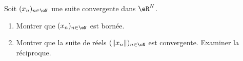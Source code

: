 \begin{exercice}[\minsyndical]\label{exoEspVectoNorme0004}

Soit $(x_n)_{n \in \eN}$ une suite convergente dans $\eR^N$.
\begin{enumerate}
	\item
 Montrer que $(x_n)_{n\in \eN} $ est bornée.
\item
Montrer que la suite de réels $(\| x_n \|)_{n\in \eN}$ 
         est convergente.
         Examiner la réciproque.

		
\end{enumerate}
\end{exercice}
